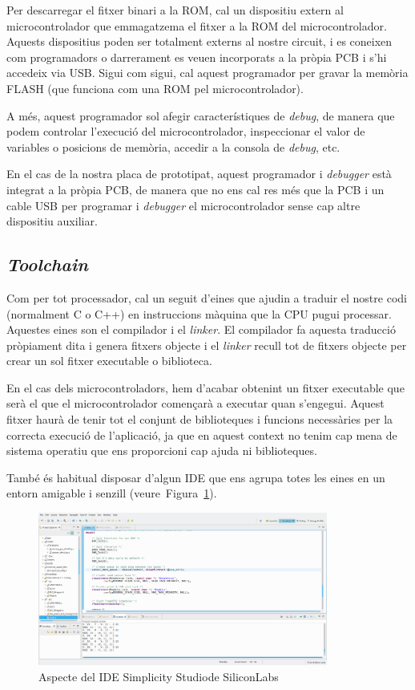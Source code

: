 Per descarregar el fitxer binari a la ROM, cal un dispositiu extern al microcontrolador que emmagatzema el fitxer a la ROM del microcontrolador. Aquests dispositius poden ser totalment externs al nostre circuit, i es coneixen com programadors o darrerament es veuen incorporats a la pròpia \gls{PCB} i s'hi accedeix via USB. Sigui com sigui, cal aquest programador per gravar la memòria FLASH (que funciona com una ROM pel microcontrolador).

A més, aquest programador sol afegir característiques de {\em debug}, de manera que podem controlar l'execució del microcontrolador, inspeccionar el valor de variables o posicions de memòria, accedir a la consola de {\em debug}, etc.

En el cas de la nostra placa de prototipat, aquest programador i {\em debugger} està integrat a la pròpia PCB, de manera que no ens cal res més que la PCB i un cable USB per programar i {\em debugger} el microcontrolador sense cap altre dispositiu auxiliar.

\subsection{{\em Toolchain}}
Com per tot processador, cal un seguit d'eines que ajudin a traduir el nostre codi (normalment C o C++) en instruccions màquina que la CPU pugui processar. Aquestes eines son el compilador i el {\em linker}. El compilador fa aquesta traducció pròpiament dita i genera fitxers objecte i el {\em linker} recull tot de fitxers objecte per crear un sol fitxer executable o biblioteca.

En el cas dels microcontroladors, hem d'acabar obtenint un fitxer executable que serà el que el microcontrolador començarà a executar quan s'engegui. Aquest fitxer haurà de tenir tot el conjunt de biblioteques i funcions necessàries per la correcta execució de l'aplicació, ja que en aquest context no tenim cap mena de sistema operatiu que ens proporcioni cap ajuda ni biblioteques.

També és habitual disposar d'algun \gls{IDE} que ens agrupa totes les eines en un entorn amigable i senzill (veure~Figura~\ref{fig:IDE}).

\begin{figure}
 \centering
 \includegraphics[width=0.85\textwidth, keepaspectratio]{imatges/capturaIDE.png}
 \caption{Aspecte del IDE Simplicity Studio\texttrademark de SiliconLabs}
 \label{fig:IDE}
\end{figure}

